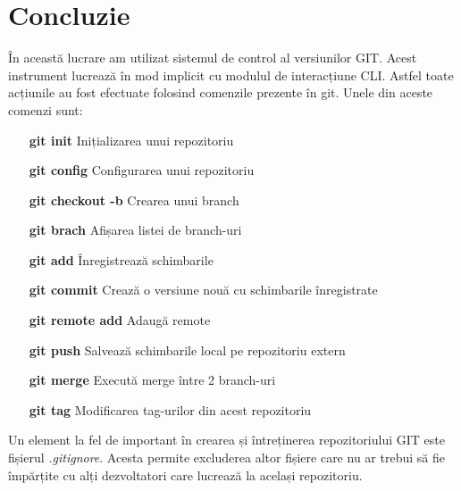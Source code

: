 \section*{Concluzie}

În această lucrare am utilizat sistemul de control al versiunilor GIT. Acest instrument lucrează în mod implicit cu modulul de interacțiune CLI. Astfel toate acțiunile 
au fost efectuate folosind comenzile prezente în git. Unele din aceste comenzi sunt:
\begin{enumerate}[leftmargin=4cm]
\item [\textbf{git init}] Inițializarea unui repozitoriu
\item [\textbf{git config}] Configurarea unui repozitoriu
\item [\textbf{git checkout -b}] Crearea unui branch
\item [\textbf{git brach}] Afișarea listei de branch-uri
\item [\textbf{git add}] Înregistrează schimbarile
\item [\textbf{git commit}] Crează o versiune nouă cu schimbarile înregistrate
\item [\textbf{git remote add}] Adaugă remote
\item [\textbf{git push}] Salvează schimbarile local pe repozitoriu extern
\item [\textbf{git merge}] Execută merge între 2 branch-uri
\item [\textbf{git tag}] Modificarea tag-urilor din acest repozitoriu
\end{enumerate}
Un element la fel de important în crearea și întreținerea repozitoriului GIT este fișierul \textit{.gitignore}. Acesta permite excluderea altor fișiere care nu ar trebui să fie împărțite cu alți dezvoltatori care lucrează la același repozitoriu.

\clearpage